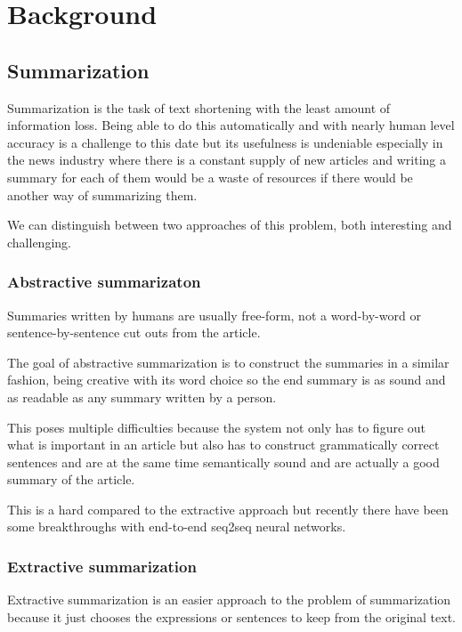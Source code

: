 \chapter{Background}\label{sect:Background}
\section{Summarization}
Summarization is the task of text shortening with the least amount of information loss. Being able to do this automatically and with nearly human level accuracy is a challenge to this date but its usefulness is undeniable especially in the news industry where there is a constant supply of new articles and writing a summary for each of them would be a waste of resources if there would be another way of summarizing them.

We can distinguish between two approaches of this problem, both interesting and challenging.

\subsection{Abstractive summarizaton}
Summaries written by humans are usually free-form, not a word-by-word or sentence-by-sentence cut outs from the article.

The goal of abstractive summarization is to construct the summaries in a similar fashion, being creative with its word choice so the end summary is as sound and as readable as any summary written by a person.

This poses multiple difficulties because the system not only has to figure out what is important in an article but also has to construct grammatically correct sentences and are at the same time semantically sound and are actually a good summary of the article.

This is a hard compared to the extractive approach but recently there have been some breakthroughs with end-to-end seq2seq neural networks.

\subsection{Extractive summarization}
Extractive summarization is an easier approach to the problem of summarization because it just chooses the expressions or sentences to keep from the original text.

